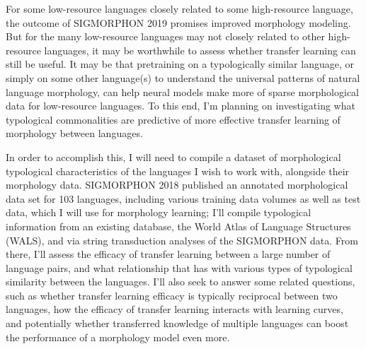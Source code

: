 For some low-resource languages closely related to some high-resource language, the outcome of SIGMORPHON 2019 promises improved morphology modeling. But for the many low-resource languages may not closely related to other high-resource languages, it may be worthwhile to assess whether transfer learning can still be useful. It may be that pretraining on a typologically similar language, or simply on some other language(s) to understand the universal patterns of natural language morphology, can help neural models make more of sparse morphological data for low-resource languages. To this end, I'm planning on investigating what typological commonalities are predictive of more effective transfer learning of morphology between languages.

In order to accomplish this, I will need to compile a dataset of morphological typological characteristics of the languages I wish to work with, alongside their morphology data. SIGMORPHON 2018 published an annotated morphological data set for 103 languages, including various training data volumes as well as test data, which I will use for morphology learning; I'll compile typological information from an existing database, the World Atlas of Language Structures (WALS), and via string transduction analyses of the SIGMORPHON data. From there, I'll assess the efficacy of transfer learning between a large number of language pairs, and what relationship that has with various types of typological similarity between the languages. I'll also seek to answer some related questions, such as whether transfer learning efficacy is typically reciprocal between two languages, how the efficacy of transfer learning interacts with learning curves, and potentially whether transferred knowledge of multiple languages can boost the performance of a morphology model even more.